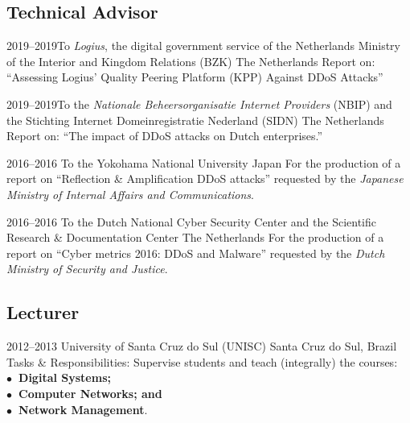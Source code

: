 \documentclass[print]{styles/friggeri-cv-linux} %
\begin{document}
\subsection{Technical Advisor}\vspace{-5pt}
\begin{entrylist}

\entry
{2019--2019}{To \textit{Logius}, the digital government service of the Netherlands Ministry of the Interior and Kingdom Relations (BZK)}
{The Netherlands}
{Report on: ``Assessing Logius' Quality Peering Platform (KPP) Against DDoS Attacks''}

\entry
{2019--2019}{To the \textit{Nationale Beheersorganisatie Internet Providers} (NBIP) and the Stichting Internet Domeinregistratie Nederland (SIDN)}
{The Netherlands}
{Report on: ``The impact of DDoS attacks on Dutch enterprises.''}
	
\entry
{2016--2016}
{To the Yokohama National University}
{Japan}
{For the production of a report on ``Reflection \& Amplification DDoS attacks''
requested by the \emph{Japanese Ministry of Internal Affairs and
Communications}.}

\entry
{2016--2016}
{To the Dutch National Cyber Security Center and the Scientific Research \& Documentation Center}
{The Netherlands}
{For the production of a report on ``Cyber metrics 2016: DDoS and Malware'' requested by the \emph{Dutch Ministry of Security and Justice}.} 

\end{entrylist}



\subsection{Lecturer}\vspace{-5pt}
\begin{entrylist}
\entry
{2012--2013}
{University of Santa Cruz do Sul (UNISC)}
{Santa Cruz do Sul, Brazil}
{Tasks \& Responsibilities: Supervise students and teach (integrally) the courses: \\
	\textbf{$\bullet$~Digital Systems;\\$\bullet$~Computer Networks; and\\$\bullet$~Network Management}.} 
\end{entrylist}

\newpage
\end{document}

